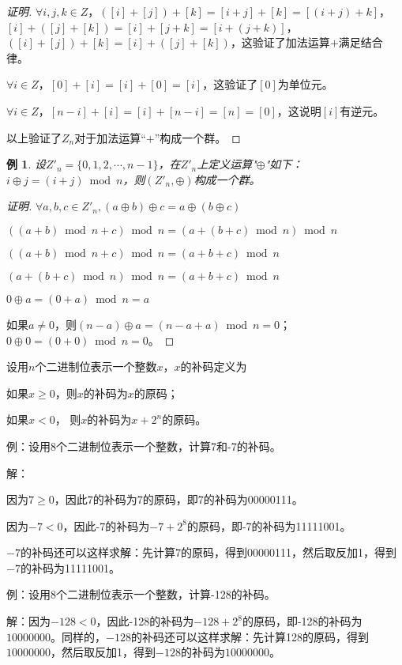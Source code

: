 \documentclass{article}
\newtheorem*{Example}{例}
\begin{document}
\begin{CJK*}{UTF8}{gbsn}
\begin{proof}[证明]
    $\forall i,j,k\in Z$，$([i]+ [j])+ [k]=[i+j]+ [k]=[(i+j)+k]$，$[i]+ ([j]+ [k])=[i]+ [j+k]=[i+(j+k)]$，$([i]+ [j])+ [k]=[i]+ ([j]+ [k])$，这验证了加法运算$+$满足结合律。
  
    $\forall i\in Z$，$[0]+[i]=[i]+[0]=[i]$，这验证了$[0]$为单位元。
  
    $\forall i\in Z$，$[n-i]+[i]=[i]+[n-i]=[n]=[0]$，这说明$[i]$有逆元。
  
    以上验证了$Z_n$对于加法运算“$+$”构成一个群。  
  \end{proof}
  
  \begin{Example}
    设$Z'_n=\{0,1,2,\cdots,n-1\}$，在$Z'_n$上定义运算"$\oplus$"如下：$i\oplus j=(i+j)\bmod n$，则$(Z'_n,\oplus)$构成一个群。
  \end{Example}
  \begin{proof}[证明]
    $\forall a,b,c\in Z'_n,(a\oplus b)\oplus c=a\oplus (b\oplus c)$
  
    $((a+b)\bmod n+c)\bmod n=(a+(b+c)\bmod n)\bmod n$
  
    $((a+b)\bmod n+c)\bmod n=(a+b+c)\bmod n$
  
    $(a+(b+c)\bmod n)\bmod n=(a+b+c)\bmod n$
  
    $0\oplus a = (0+a)\bmod n = a$
  
    如果$a\neq 0$，则$(n-a)\oplus a = (n-a+a)\bmod n = 0$；$0\oplus 0=(0+0)\bmod n=0$。
  \end{proof}
  
  
  设用$n$个二进制位表示一个整数$x$，$x$的补码定义为
  
  如果$x\geq 0$，则$x$的补码为$x$的原码；
  
  如果$x < 0$， 则$x$的补码为$x+2^n$的原码。
  
  例：设用8个二进制位表示一个整数，计算7和-7的补码。
  
  解：
  
  因为$7\geq 0$，因此7的补码为7的原码，即7的补码为00000111。
  
  因为$-7 < 0$，因此-7的补码为$-7+2^8$的原码，即-7的补码为11111001。
  
  $-7$的补码还可以这样求解：先计算7的原码，得到00000111，然后取反加1，得到$-7$的补码为11111001。
  
  例：设用8个二进制位表示一个整数，计算-128的补码。
  
  解：因为$-128 < 0$，因此-128的补码为$-128+2^8$的原码，即-128的补码为$10000000$。同样的，$-128$的补码还可以这样求解：先计算128的原码，得到$10000000$，然后取反加1，得到$-128$的补码为$10000000$。
  

\end{CJK*}
\end{document}
